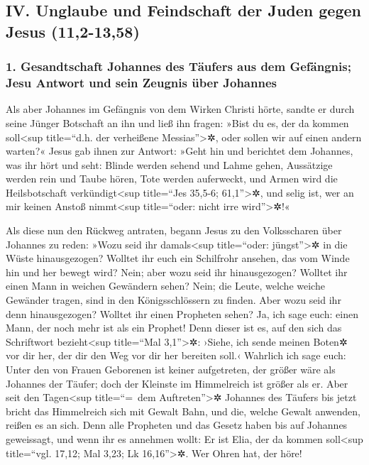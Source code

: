 \hypertarget{iv.-unglaube-und-feindschaft-der-juden-gegen-jesus-112-1358}{%
\subsection{IV. Unglaube und Feindschaft der Juden gegen Jesus
(11,2-13,58)}\label{iv.-unglaube-und-feindschaft-der-juden-gegen-jesus-112-1358}}

\hypertarget{gesandtschaft-johannes-des-tuxe4ufers-aus-dem-gefuxe4ngnis-jesu-antwort-und-sein-zeugnis-uxfcber-johannes}{%
\subsubsection{1. Gesandtschaft Johannes des Täufers aus dem Gefängnis;
Jesu Antwort und sein Zeugnis über
Johannes}\label{gesandtschaft-johannes-des-tuxe4ufers-aus-dem-gefuxe4ngnis-jesu-antwort-und-sein-zeugnis-uxfcber-johannes}}

 Als aber Johannes im Gefängnis von dem Wirken Christi
hörte, sandte er durch seine Jünger Botschaft an ihn  und
ließ ihn fragen: »Bist du es, der da kommen soll\textless sup
title=``d.h. der verheißene Messias''\textgreater✲, oder sollen wir auf
einen andern warten?«  Jesus gab ihnen zur Antwort: »Geht
hin und berichtet dem Johannes, was ihr hört und seht: 
Blinde werden sehend und Lahme gehen, Aussätzige werden rein und Taube
hören, Tote werden auferweckt, und Armen wird die Heilsbotschaft
verkündigt\textless sup title=``Jes 35,5-6; 61,1''\textgreater✲,
 und selig ist, wer an mir keinen Anstoß
nimmt\textless sup title=``oder: nicht irre wird''\textgreater✲!«

 Als diese nun den Rückweg antraten, begann Jesus zu den
Volksscharen über Johannes zu reden: »Wozu seid ihr damals\textless sup
title=``oder: jüngst''\textgreater✲ in die Wüste hinausgezogen? Wolltet
ihr euch ein Schilfrohr ansehen, das vom Winde hin und her bewegt wird?
 Nein; aber wozu seid ihr hinausgezogen? Wolltet ihr einen
Mann in weichen Gewändern sehen? Nein; die Leute, welche weiche Gewänder
tragen, sind in den Königsschlössern zu finden.  Aber wozu
seid ihr denn hinausgezogen? Wolltet ihr einen Propheten sehen? Ja, ich
sage euch: einen Mann, der noch mehr ist als ein Prophet!
 Denn dieser ist es, auf den sich das Schriftwort
bezieht\textless sup title=``Mal 3,1''\textgreater✲: ›Siehe, ich sende
meinen Boten✲ vor dir her, der dir den Weg vor dir her bereiten soll.‹
 Wahrlich ich sage euch: Unter den von Frauen Geborenen
ist keiner aufgetreten, der größer wäre als Johannes der Täufer; doch
der Kleinste im Himmelreich ist größer als er.  Aber seit
den Tagen\textless sup title=``=~dem Auftreten''\textgreater✲ Johannes
des Täufers bis jetzt bricht das Himmelreich sich mit Gewalt Bahn, und
die, welche Gewalt anwenden, reißen es an sich.  Denn
alle Propheten und das Gesetz haben bis auf Johannes geweissagt,
 und wenn ihr es annehmen wollt: Er ist Elia, der da
kommen soll\textless sup title=``vgl. 17,12; Mal 3,23; Lk
16,16''\textgreater✲.  Wer Ohren hat, der höre!

